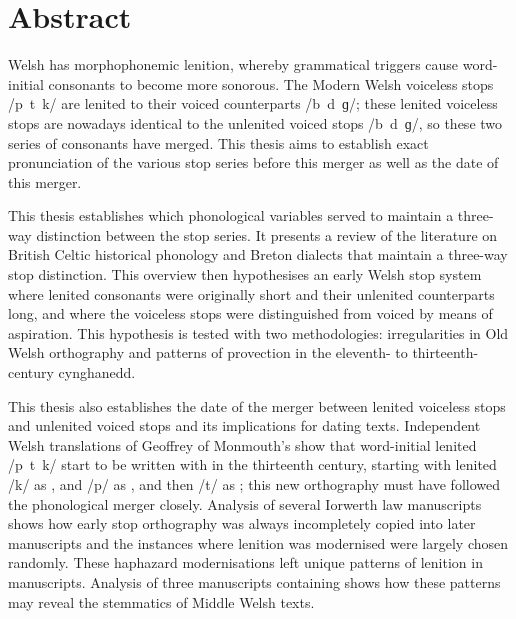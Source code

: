 \chapter*{Abstract}%
\label{cha:abstract}

Welsh has morphophonemic lenition, whereby grammatical triggers cause word-initial consonants to become more sonorous. The Modern Welsh voiceless stops /p~t~k/ are lenited to their voiced counterparts /b~d~ɡ/; these lenited voiceless stops are nowadays identical to the unlenited voiced stops /b~d~ɡ/, so these two series of consonants have merged. This thesis aims to establish exact pronunciation of the various stop series before this merger as well as the date of this merger. 

This thesis establishes which phonological variables served to maintain a three-way  distinction between the stop series. It presents a review of the literature on British Celtic historical phonology and Breton dialects that maintain a three-way stop distinction. This overview then hypothesises an early Welsh stop system where lenited consonants were originally short and their unlenited counterparts long, and where the voiceless stops were distinguished from voiced by means of aspiration. This hypothesis is tested with two methodologies: irregularities in Old Welsh orthography and patterns of provection in the eleventh- to thirteenth-century cynghanedd.

This thesis also establishes the date of the merger between lenited voiceless stops and unlenited voiced stops and its implications for dating texts. Independent Welsh translations of Geoffrey of Monmouth’s  show that word-initial lenited /p~t~k/ start to be written with  in the thirteenth century, starting with lenited /k/ as , and /p/ as , and then /t/ as ; this new orthography must have followed the phonological merger closely. Analysis of several Iorwerth law manuscripts shows how early stop orthography was always incompletely copied into later manuscripts and the instances  where lenition was modernised were largely chosen randomly. These haphazard modernisations left unique patterns of lenition in manuscripts. Analysis of three manuscripts containing  shows how these patterns may reveal the stemmatics of Middle Welsh texts.


